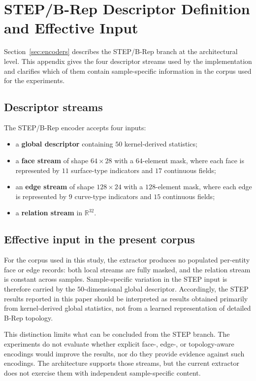 \documentclass[preprint,12pt]{elsarticle}
\begin{document}
\section{STEP/B-Rep Descriptor Definition and Effective Input}
\label{app:step_features}

Section~\ref{sec:encoders} describes the STEP/B-Rep branch at the architectural level.
This appendix gives the four descriptor streams used by the implementation and clarifies
which of them contain sample-specific information in the corpus used for the experiments.

\subsection{Descriptor streams}
\label{app:step_streams}

The STEP/B-Rep encoder accepts four inputs:

\begin{itemize}
  \item a \textbf{global descriptor} containing $50$ kernel-derived statistics;
  \item a \textbf{face stream} of shape $64\times28$ with a $64$-element mask, where each
        face is represented by $11$ surface-type indicators and $17$ continuous fields;
  \item an \textbf{edge stream} of shape $128\times24$ with a $128$-element mask, where each
        edge is represented by $9$ curve-type indicators and $15$ continuous fields;
  \item a \textbf{relation stream} in $\mathbb{R}^{32}$.
\end{itemize}

\subsection{Effective input in the present corpus}
\label{app:step_effective}

For the corpus used in this study, the extractor produces no populated per-entity face or
edge records: both local streams are fully masked, and the relation stream is constant
across samples. Sample-specific variation in the STEP input is therefore carried by the
$50$-dimensional global descriptor. Accordingly, the STEP results reported in this paper
should be interpreted as results obtained primarily from kernel-derived global statistics,
not from a learned representation of detailed B-Rep topology.

This distinction limits what can be concluded from the STEP branch. The experiments do not
evaluate whether explicit face-, edge-, or topology-aware encodings would improve the
results, nor do they provide evidence against such encodings. The architecture supports
those streams, but the current extractor does not exercise them with independent
sample-specific content.
\end{document}
